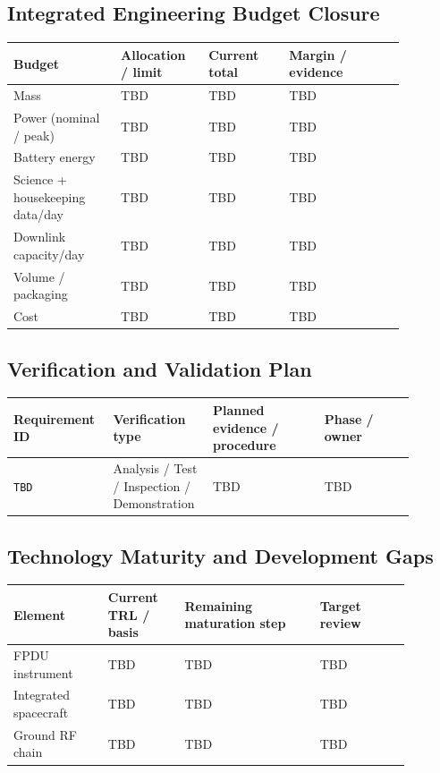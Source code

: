 
\subsection{Integrated Engineering Budget Closure}\label{sec:budget-closure}
\begin{longtable}{p{0.24\linewidth}p{0.19\linewidth}p{0.18\linewidth}p{0.26\linewidth}}
\toprule
Budget & Allocation / limit & Current total & Margin / evidence \\
\midrule
\endhead
Mass & TBD & TBD & TBD \\
Power (nominal / peak) & TBD & TBD & TBD \\
Battery energy & TBD & TBD & TBD \\
Science + housekeeping data/day & TBD & TBD & TBD \\
Downlink capacity/day & TBD & TBD & TBD \\
Volume / packaging & TBD & TBD & TBD \\
Cost & TBD & TBD & TBD \\
\bottomrule
\end{longtable}

\subsection{Verification and Validation Plan}\label{sec:vv-plan}
\begin{longtable}{p{0.21\linewidth}p{0.21\linewidth}p{0.26\linewidth}p{0.21\linewidth}}
\toprule
Requirement ID & Verification type & Planned evidence / procedure & Phase / owner \\
\midrule
\endhead
\texttt{TBD} & Analysis / Test / Inspection / Demonstration & TBD & TBD \\
\bottomrule
\end{longtable}

\subsection{Technology Maturity and Development Gaps}\label{sec:trl-gaps}
\begin{longtable}{p{0.21\linewidth}p{0.17\linewidth}p{0.30\linewidth}p{0.20\linewidth}}
\toprule
Element & Current TRL / basis & Remaining maturation step & Target review \\
\midrule
\endhead
FPDU instrument & TBD & TBD & TBD \\
Integrated spacecraft & TBD & TBD & TBD \\
Ground RF chain & TBD & TBD & TBD \\
\bottomrule
\end{longtable}

